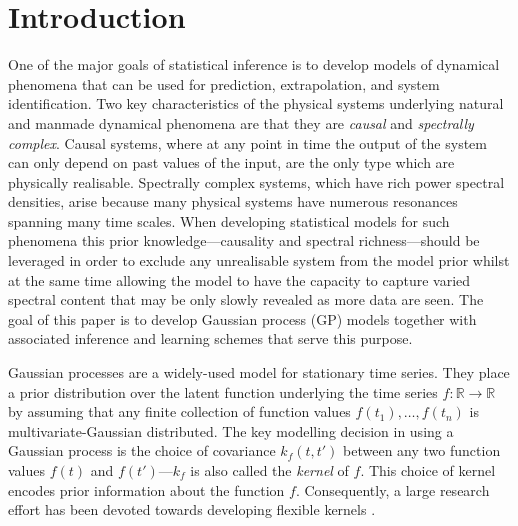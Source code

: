 \documentclass{article}
\newcommand{\R}{\mathbb{R}}   %
\begin{document}
\section{Introduction}

One of the major goals of statistical inference is to develop models of dynamical phenomena that can be used for prediction, extrapolation, and system identification. Two key characteristics of the physical systems underlying natural and manmade dynamical phenomena are that they are \textit{causal} and \textit{spectrally complex}. Causal systems, where at any point in time the output of the system can only depend on past values of the input, are the only type which are physically realisable. Spectrally complex systems, which have rich power spectral densities, arise because many physical systems have numerous resonances spanning many time scales. When developing statistical models for such phenomena this prior knowledge---causality and spectral richness---should be leveraged in order to exclude any unrealisable system from the model prior whilst at the same time allowing the model to have the capacity to capture varied spectral content that may be only slowly revealed as more data are seen. The goal of this paper is to develop Gaussian process (GP) models together with associated inference and learning schemes that serve this purpose.

Gaussian processes are a widely-used model for stationary time series. They place a prior distribution over the latent function underlying the time series $f:\R \to \R$ by assuming that any finite collection of function values $f(t_1),\ldots,f(t_n)$ is multivariate-Gaussian distributed. The key modelling decision in using a Gaussian process is the choice of covariance $k_f(t,t')$ between any two function values $f(t)$ and $f(t')$---$k_f$ is also called the \textit{kernel} of $f$. This choice of kernel encodes prior information about the function $f$. Consequently, a large research effort has been devoted towards developing flexible kernels \cite{Duvenaud:2014:Automatic_Construction,Wilson:2013:Spectral_Mixture,Tobar:2015:Learning_Stationary,Tobar:2015:Inter-Domain_Inducing}.
\end{document}
